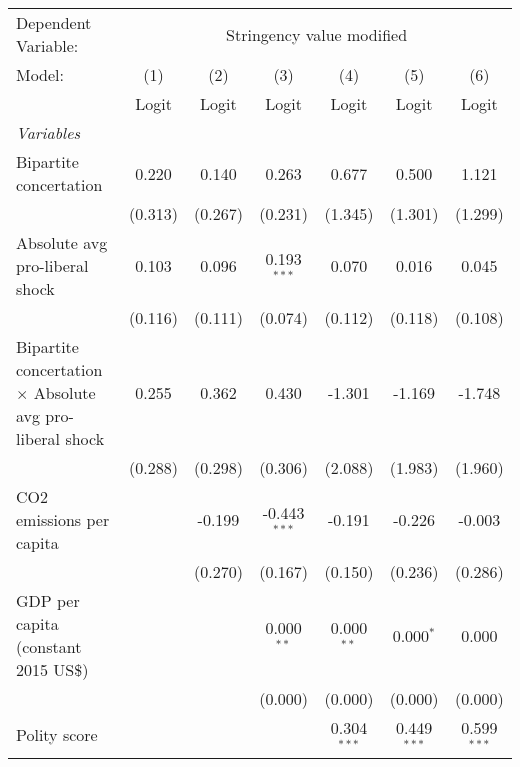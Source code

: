
\begingroup
\centering
\begin{tabular}{lcccccc}
   \toprule
   Dependent Variable: & \multicolumn{6}{c}{Stringency value modified}\\
   Model:                                                          & (1)     & (2)     & (3)            & (4)           & (5)           & (6)\\  
                                                                   &  Logit  & Logit   & Logit          & Logit         & Logit         & Logit\\  
   \midrule
   \emph{Variables}\\
   Bipartite concertation                                          & 0.220   & 0.140   & 0.263          & 0.677         & 0.500         & 1.121\\   
                                                                   & (0.313) & (0.267) & (0.231)        & (1.345)       & (1.301)       & (1.299)\\   
   Absolute avg pro-liberal shock                                  & 0.103   & 0.096   & 0.193$^{***}$  & 0.070         & 0.016         & 0.045\\   
                                                                   & (0.116) & (0.111) & (0.074)        & (0.112)       & (0.118)       & (0.108)\\   
   Bipartite concertation $\times$ Absolute avg pro-liberal shock  & 0.255   & 0.362   & 0.430          & -1.301        & -1.169        & -1.748\\   
                                                                   & (0.288) & (0.298) & (0.306)        & (2.088)       & (1.983)       & (1.960)\\   
   CO2 emissions per capita                                        &         & -0.199  & -0.443$^{***}$ & -0.191        & -0.226        & -0.003\\   
                                                                   &         & (0.270) & (0.167)        & (0.150)       & (0.236)       & (0.286)\\   
   GDP per capita (constant 2015 US\$)                             &         &         & 0.000$^{**}$   & 0.000$^{**}$  & 0.000$^{*}$   & 0.000\\   
                                                                   &         &         & (0.000)        & (0.000)       & (0.000)       & (0.000)\\   
   Polity score                                                    &         &         &                & 0.304$^{***}$ & 0.449$^{***}$ & 0.599$^{***}$\\   

\end{tabular}

